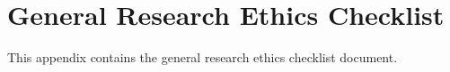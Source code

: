 %
%
%                 

\chapter{General Research Ethics Checklist}
\label{sec:appendixe}

This appendix contains the general research ethics checklist document. 



